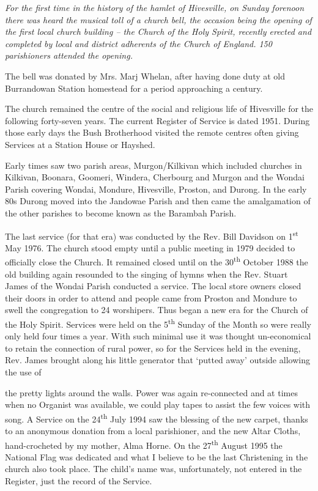 \emph{For the first time in the history of the hamlet of Hivesville, on Sunday forenoon there was heard the musical toll of a church bell, the occasion being the opening of the first local church building -- the Church of the Holy Spirit, recently erected and completed by local and district adherents of the Church of England. 150 parishioners attended the opening.}

The bell was donated by Mrs. Marj Whelan, after having done duty at old Burrandowan Station homestead for a period approaching a century.

The church remained the centre of the social and religious life of Hivesville for the following forty-seven years. The current Register of Service is dated 1951. During those early days the Bush Brotherhood visited the remote centres often giving Services at a Station House or Hayshed.

Early times saw two parish areas, Murgon/Kilkivan which included churches in Kilkivan, Boonara, Goomeri, Windera, Cherbourg and Murgon and the Wondai Parish covering Wondai, Mondure, Hivesville, Proston, and Durong. In the early 80s Durong moved into the Jandowae Parish and then came the amalgamation of the other parishes to become known as the Barambah Parish.

The last service (for that era) was conducted by the Rev. Bill Davidson on 1\textsuperscript{st} May 1976. The church stood empty until a public meeting in 1979 decided to officially close the Church. It remained closed until on the 30\textsuperscript{th} October 1988 the old building again resounded to the singing of hymns when the Rev. Stuart James of the Wondai Parish conducted a service. The local store owners closed their doors in order to attend and people came from Proston and Mondure to swell the congregation to 24 worshipers. Thus began a new era for the Church of the Holy Spirit. Services were held on the 5\textsuperscript{th} Sunday of the Month so were really only held four times a year. With such minimal use it was thought un-economical to retain the connection of rural power, so for the Services held in the evening, Rev. James brought along his little generator that `putted away' outside allowing the use of

the pretty lights around the walls. Power was again re-connected and at times when no Organist was available, we could play tapes to assist the few voices with song. A Service on the 24\textsuperscript{th} July 1994 saw the blessing of the new carpet, thanks to an anonymous donation from a local parishioner, and the new Altar Cloths, hand-crocheted by my mother, Alma Horne. On the 27\textsuperscript{th} August 1995 the National Flag was dedicated and what I believe to be the last Christening in the church also took place. The child's name was, unfortunately, not entered in the Register, just the record of the Service.

